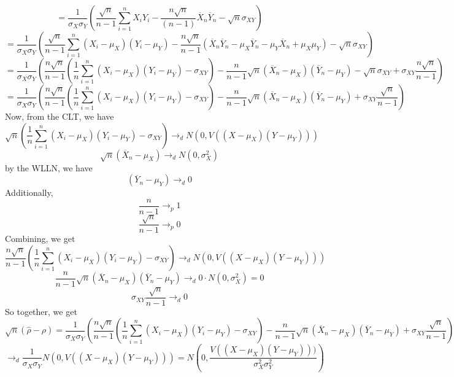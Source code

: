 \documentclass[10pt,letter]{article}
\begin{document}
\begin{enumerate}[label=(\roman*)]
\[ = \frac{1}{\sigma_X\sigma_Y}\left( \frac{\sqrt{n}}{n-1} \sum_{i=1}^n X_i Y_i - \frac{ n\sqrt{n} }{(n-1)}\overline{X}_n\overline{Y}_n - \sqrt{n}\sigma_{XY} \right)  \]
\[ = \frac{1}{\sigma_X\sigma_Y}\left( \frac{\sqrt{n}}{n-1} \sum_{i=1}^n (X_i - \mu_X) (Y_i - \mu_Y) - \frac{n\sqrt{n}}{n-1}(\overline{X}_n\overline{Y}_n - \mu_X \overline{Y}_n - \mu_Y \overline{X}_n + \mu_X\mu_Y)  - \sqrt{n}\sigma_{XY} \right)  \]
\[ = \frac{1}{\sigma_X\sigma_Y}\left( \frac{n\sqrt{n}}{n-1} \left(\frac{1}{n} \sum_{i=1}^n (X_i - \mu_X) (Y_i - \mu_Y) - \sigma_{XY}\right) - \frac{n}{n-1}\sqrt{n}(\overline{X}_n-\mu_X)(\overline{Y}_n -\mu_Y)  - \sqrt{n}\sigma_{XY} + \sigma_{XY} \frac{n\sqrt{n}}{n-1} \right)  \]
\[ = \frac{1}{\sigma_X\sigma_Y}\left( \frac{n\sqrt{n}}{n-1} \left(\frac{1}{n} \sum_{i=1}^n (X_i - \mu_X) (Y_i - \mu_Y) - \sigma_{XY}\right) - \frac{n}{n-1}\sqrt{n}(\overline{X}_n-\mu_X)(\overline{Y}_n -\mu_Y) + \sigma_{XY} \frac{\sqrt{n}}{n-1} \right)  \]
Now, from the CLT, we have
\[ \sqrt{n}\left(\frac{1}{n} \sum_{i=1}^n (X_i - \mu_X) (Y_i - \mu_Y) - \sigma_{XY}\right) \to_d N(0, V((X - \mu_X) (Y - \mu_Y))) \]
\[ \sqrt{n}(\overline{X}_n-\mu_X) \to_d N(0, \sigma_X^2)\]
by the WLLN, we have
\[ (\overline{Y}_n -\mu_Y) \to_d 0\]
Additionally,
\[ \frac{n}{n-1} \to_p 1 \]
\[ \frac{\sqrt{n}}{n-1}\to_p 0\]
Combining, we get
\[\frac{n\sqrt{n}}{n-1} \left(\frac{1}{n} \sum_{i=1}^n (X_i - \mu_X) (Y_i - \mu_Y) - \sigma_{XY}\right) \to_d N(0, V((X - \mu_X) (Y - \mu_Y))) \]
\[ \frac{n}{n-1}\sqrt{n}(\overline{X}_n-\mu_X)(\overline{Y}_n -\mu_Y) \to_d 0\cdot N(0, \sigma_X^2) = 0\]
\[ \sigma_{XY} \frac{\sqrt{n}}{n-1} \to_d 0\]
So together, we get
\[\sqrt{n}( \hat{ \rho} - \rho) = \frac{1}{\sigma_X\sigma_Y}\left( \frac{n\sqrt{n}}{n-1} \left(\frac{1}{n} \sum_{i=1}^n (X_i - \mu_X) (Y_i - \mu_Y) - \sigma_{XY}\right) - \frac{n}{n-1}\sqrt{n}(\overline{X}_n-\mu_X)(\overline{Y}_n -\mu_Y) + \sigma_{XY} \frac{\sqrt{n}}{n-1} \right)\] \[ \to_d \frac{1}{\sigma_X\sigma_Y} N(0, V((X - \mu_X) (Y - \mu_Y))) = N\left(0, \frac{V((X - \mu_X) (Y - \mu_Y)))}{\sigma_X^2 \sigma_Y^2} \right) \]



\end{enumerate}
\end{document}
